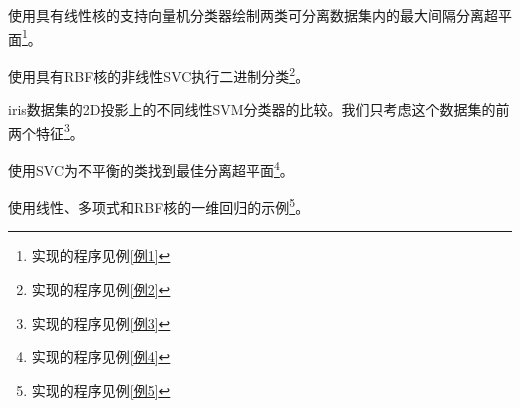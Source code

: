 \begin{Example}
	使用具有线性核的支持向量机分类器绘制两类可分离数据集内的最大间隔分离超平面\footnote{实现的程序见例\ref{例1}}。
\end{Example}

\begin{Example}
	使用具有RBF核的非线性SVC执行二进制分类\footnote{实现的程序见例\ref{例2}}。
\end{Example}

\begin{Example}
	iris数据集的2D投影上的不同线性SVM分类器的比较。我们只考虑这个数据集的前两个特征\footnote{实现的程序见例\ref{例3}}。
\end{Example}

\begin{Example}
	使用SVC为不平衡的类找到最佳分离超平面\footnote{实现的程序见例\ref{例4}}。
\end{Example}

\begin{Example}
	使用线性、多项式和RBF核的一维回归的示例\footnote{实现的程序见例\ref{例5}}。
\end{Example}
